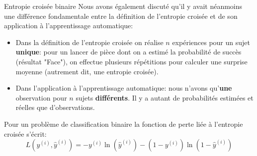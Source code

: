 \begin{frame}{Entropie croisée binaire}
	Nous avons également discuté qu'il y avait néanmoins une différence fondamentale entre la définition de l'entropie croisée et de son application à l'apprentissage automatique:
	\begin{itemize}
		\item Dans la définition de l'entropie croisée on réalise $n$ expériences pour un sujet \textbf{unique}: pour un lancer de pièce dont on a estimé la probabilité de succès (résultat "Face"), on effectue plusieurs répétitions pour calculer une surprise moyenne (autrement dit, une entropie croisée).
		\item Dans l'application à l'apprentissage automatique: nous n'avons qu'\textbf{une} observation pour $n$ sujets \textbf{différents}. Il y a  autant de probabilités estimées et réelles que d'observations.
	\end{itemize}
	\pause
	Pour un problème de classification binaire la fonction de perte liée à l'entropie croisée s'écrit:
	\begin{equation*}
		L\left(y^{(i)}, \hat{y}^{(i)}\right) = - y^{(i)} \ln{\left(\hat{y}^{(i)}\right)} - \left(1 - y^{(i)}\right) \ln{\left(1 - \hat{y}^{(i)}\right)}
	\end{equation*}
\end{frame}

